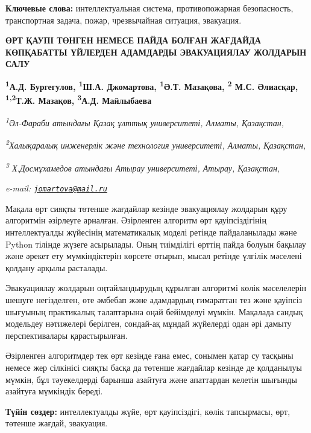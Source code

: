 {\bfseries Ключевые слова:} интеллектуальная система, противопожарная
безопасность, транспортная задача, пожар, чрезвычайная ситуация,
эвакуация.

\begin{articleheader}
{\bfseries ӨРТ ҚАУПІ ТӨНГЕН НЕМЕСЕ ПАЙДА БОЛҒАН ЖАҒДАЙДА КӨПҚАБАТТЫ ҮЙЛЕРДЕН АДАМДАРДЫ ЭВАКУАЦИЯЛАУ ЖОЛДАРЫН САЛУ}

{\bfseries \textsuperscript{1}А.Д. Бургегулов,
\textsuperscript{1}Ш.А. Джомартова\textsuperscript{\envelope },
\textsuperscript{1}Ә.Т. Мазақова,
\textsuperscript{2} М.С. Әлиасқар,
\textsuperscript{1,2}Т.Ж. Мазақов,
\textsuperscript{3}А.Д. Майлыбаева}
\end{articleheader}

\begin{affiliation}
\emph{\textsuperscript{1}Әл-Фараби атындағы Қазақ ұлттық университеті, Алматы, Қазақстан,}

\emph{\textsuperscript{2}Халықаралық инженерлік және технология университеті, Алматы, Қазақстан,}

\emph{\textsuperscript{3} Х.Досмұхамедов атындағы Атырау университеті, Атырау, Қазақстан,}

\emph{e-mail: \href{mailto:jomartova@mail.ru}{\nolinkurl{jomartova@mail.ru}}}
\end{affiliation}

Мақала өрт сияқты төтенше жағдайлар кезінде эвакуациялау жолдарын құру
алгоритмін әзірлеуге арналған. Әзірленген алгоритм өрт қауіпсіздігінің
интеллектуалды жүйесінің математикалық моделі ретінде пайдаланылады және
Python тілінде жүзеге асырылады. Оның тиімділігі өрттің пайда болуын
бақылау және әрекет ету мүмкіндіктерін көрсете отырып, мысал ретінде
үлгілік мәселені қолдану арқылы расталады.

Эвакуациялау жолдарын оңтайландырудың құрылған алгоритмі көлік
мәселелерін шешуге негізделген, өте әмбебап және адамдардың ғимараттан
тез және қауіпсіз шығуының практикалық талаптарына оңай бейімделуі
мүмкін. Мақалада сандық модельдеу нәтижелері берілген, сондай-ақ мұндай
жүйелерді одан әрі дамыту перспективалары қарастырылған.

Әзірленген алгоритмдер тек өрт кезінде ғана емес, сонымен қатар су
тасқыны немесе жер сілкінісі сияқты басқа да төтенше жағдайлар кезінде
де қолданылуы мүмкін, бұл тәуекелдерді барынша азайтуға және апаттардан
келетін шығынды азайтуға мүмкіндік береді.

{\bfseries Түйін сөздер:} интеллектуалды жүйе, өрт қауіпсіздігі, көлік
тапсырмасы, өрт, төтенше жағдай, эвакуация.

